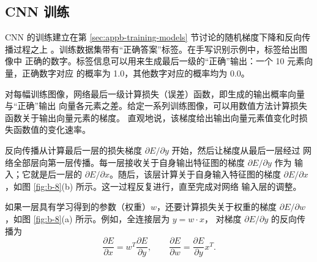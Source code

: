 \subsection{CNN 训练}
\label{sec:appb-cnn-training}

CNN 的训练建立在第 \ref{sec:appb-training-models} 节讨论的随机梯度下降和反向传播过程之上
\cite{appb-rumelhart}。训练数据集带有“正确答案”标签。在手写识别示例中，标签给出图像中
正确的数字。标签信息可以用来生成最后一级的“正确”输出：一个 10 元素向量，正确数字对应
的概率为 1.0，其他数字对应的概率均为 0.0。

对每幅训练图像，网络最后一级计算损失（误差）函数，即生成的输出概率向量与“正确”输出
向量各元素之差。给定一系列训练图像，可以用数值方法计算损失函数关于输出向量元素的梯度。
直观地说，该梯度给出输出向量元素值变化时损失函数值的变化速率。

反向传播从计算最后一层的损失梯度 $\partial E/\partial y$ 开始，然后让梯度从最后一层经过
网络全部层向第一层传播。每一层接收关于自身输出特征图的梯度 $\partial E/\partial y$ 作为
输入；它就是后一层的 $\partial E/\partial x$。随后，该层计算关于自身输入特征图的梯度
$\partial E/\partial x$，如图 \ref{fig:b-8}(b) 所示。这一过程反复进行，直至完成对网络
输入层的调整。

如果一层具有学习得到的参数（权重）$w$，还要计算损失关于权重的梯度
$\partial E/\partial w$，如图 \ref{fig:b-8}(a) 所示。例如，全连接层为 $y=w\cdot x$，
对梯度 $\partial E/\partial y$ 的反向传播为
\begin{equation}
  \frac{\partial E}{\partial x}=w^T\frac{\partial E}{\partial y},
  \qquad
  \frac{\partial E}{\partial w}=\frac{\partial E}{\partial y}x^T.
  \label{eq:appb-21}
\end{equation}

